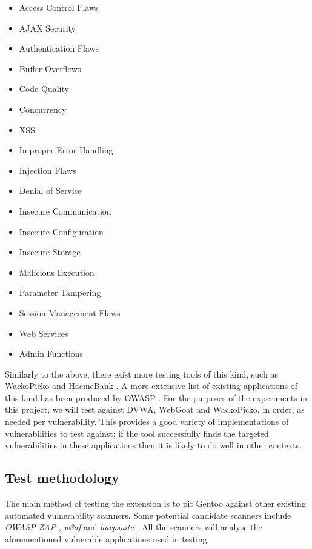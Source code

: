 \begin{multicols}{3}
	\begin{itemize}
		\item 	Access Control Flaws
		\item 	AJAX Security
		\item 	Authentication Flaws
		\item 	Buffer Overflows
		\item 	Code Quality
		\item 	Concurrency
		\item 	XSS
		\item 	Improper Error Handling
		\item 	Injection Flaws
		\item 	Denial of Service
		\item 	Insecure Communication
		\item 	Insecure Configuration
		\item 	Insecure Storage
		\item 	Malicious Execution
		\item 	Parameter Tampering
		\item 	Session Management Flaws
		\item 	Web Services
		\item 	Admin Functions
	\end{itemize}
\end{multicols}

Similarly to the above, there exist more testing tools of this kind, such as WackoPicko \cite{wackoPickoGithub} and HacmeBank \cite{hacmeBankMcAfee}. A more extensive list of existing applications of this kind has been produced by OWASP \cite{owaspVulnerableWebAppsList}. For the purposes of the experiments in this project, we will test against DVWA, WebGoat and WackoPicko, in order, as needed per vulnerability. This provides a good variety of implementations of vulnerabilities to test against; if the tool successfully finds the targeted vulnerabilities in these applications then it is likely to do well in other contexts.

\subsection{Test methodology}
The main method of testing the extension is to pit Gentoo against other existing automated vulnerability scanners. Some potential candidate scanners include \emph{OWASP ZAP} \cite{owaspZapPage}, \emph{w3af} \cite{w3af} and \emph{burpsuite} \cite{burpSuitePage}. All the scanners will analyse the aforementioned vulnerable applications used in testing. \\

